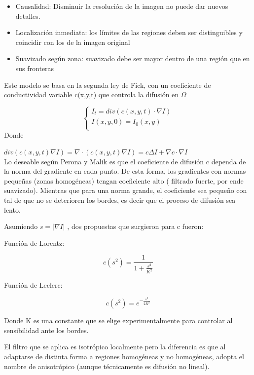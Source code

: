 \documentclass[assd_tpf_lineasinvest.tex]{subfiles}
\begin{document}
\begin{itemize}
  \item Causalidad: Disminuir la resolución de la imagen no puede dar nuevos detalles.
  \item Localización inmediata: los límites de las regiones deben ser distinguibles y coincidir con los de la imagen original
  \item Suavizado según zona: suavizado debe ser mayor dentro de una región que en sus fronteras
\end{itemize}

Este modelo se basa en la segunda ley de Fick, con un coeficiente de conductividad variable c(x,y,t) que controla la difusión en $\Omega$

  \[
    \left\{
                \begin{array}{ll}
                  I_t = div(c(x,y,t)\cdot \nabla I) \\
                  I(x,y,0) = I_0(x,y)\\
                \end{array}
              \right.
  \]
Donde 

$div(c(x,y,t) \nabla I) = \nabla \cdot (c(x,y,t) \nabla I) =c\Delta I + \nabla c \cdot \nabla I$
\\


Lo deseable según Perona y Malik es que el coeficiente de difusión c dependa de la norma del gradiente en cada punto. De esta forma, los gradientes con normas pequeñas (zonas homogéneas) tengan coeficiente alto ( filtrado fuerte, por ende suavizado). Mientras que para una norma grande, el coeficiente sea pequeño con tal de que no se deterioren los bordes, es decir que el proceso de difusión sea lento.

Asumiendo $s= |\nabla I|$ , dos propuestas que surgieron para c fueron:

Función de Lorentz:

\[
  c(s^2) = \frac{1}{1+ \frac{s^2}{K^2}}
\]

Función de Leclerc:

\[
  c(s^2) = e^{-\frac{s^2}{2K^2}}
\]

Donde K es una constante que se elige experimentalmente para controlar al sensibilidad ante los bordes.

 El filtro que se aplica es isotrópico localmente pero la diferencia es que al adaptarse de distinta forma a regiones homogéneas y no homogéneas, adopta el nombre de anisotrópico (aunque técnicamente es difusión no lineal). 
\end{document}
